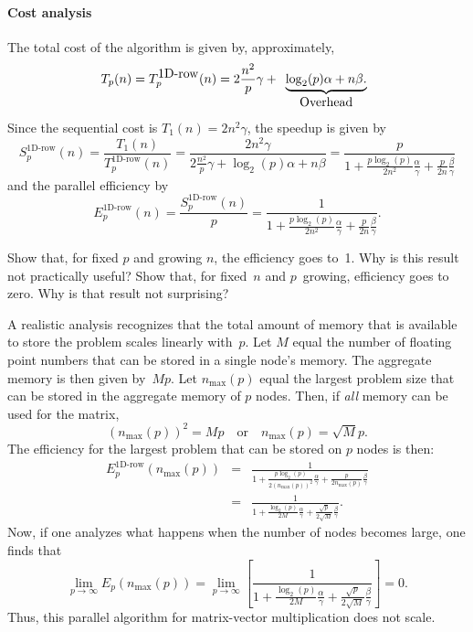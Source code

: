 \paragraph*{Cost analysis}

The total cost of the algorithm is given by, approximately,
\[
T_p(n) = T_p^{\mbox{1D-row}}(n) = 
2 \frac{n^2}{p} \gamma + 
\begin{array}[t]{c}
\underbrace{\log_2(p) \alpha + n \beta.}
\\
\mbox{Overhead}
\end{array}
\]
Since the sequential cost is $ T_1(n) = 2 n^2 \gamma $, the speedup is given by
\[
S_p^{\mbox{1D-row}}(n) = 
\frac{T_1(n)}
{T_p^{\mbox{1D-row}}(n)} = 
\frac{2 n^2 \gamma}
{ 2 \frac{n^2}{p} \gamma + 
\log_2(p) \alpha + n \beta}
= 
\frac{p}
{ 1 + \frac{p \log_2(p)}{2 n^2} \frac{\alpha}{\gamma} 
+ \frac{p}{2 n} \frac{\beta}{\gamma} }
\]
and the parallel efficiency by
\[
E_p^{\mbox{1D-row}}(n) = 
\frac{S_p^{\mbox{1D-row}}(n)}{p}
= 
\frac{1}
{ 1 + \frac{p \log_2(p)}{2 n^2} \frac{\alpha}{\gamma} 
+ \frac{p}{2 n} \frac{\beta}{\gamma} }.
\]

\begin{exercise}
  Show that, for fixed $p$ and growing $n$, the efficiency goes
  to~1. Why is this result not practically useful? Show that, for
  fixed~$n$ and $p$~growing, efficiency goes to zero. Why is that
  result not surprising?
\end{exercise}

A realistic analysis recognizes that the total amount of memory that is
available to store the problem scales linearly with~$ p $.  Let $ M $
equal the number of floating point numbers that can be stored in a
single node's memory.  The aggregate memory is then given by~$ M p $.
Let $ n_{\mbox{max}}(p) $ equal the largest problem size that can be
stored in the aggregate memory of $ p $ nodes.  Then, if {\em all}
memory can be used for the matrix,
\[
(n_{\mbox{max}}(p))^2 = M p
\quad
\mbox{or}
\quad
n_{\mbox{max}}(p) = \sqrt{M} {p}.
\]
The efficiency for the largest problem that can be stored on $ p $
nodes is then:
\begin{eqnarray*}
E_p^{\mbox{1D-row}}(n_{\mbox{max}}(p)) &=& 
\frac{1}
{1 + \frac{p \log_2(p)}{2 (n_{\mbox{max}}(p))^2} \frac{\alpha}{\gamma} 
+ \frac{p}{2 n_{\mbox{max}}(p)} \frac{\beta}{\gamma} }
\\
&=&
\frac{1}
{ 1 + \frac{\log_2(p)}{2 M} \frac{\alpha}{\gamma} 
+ \frac{\sqrt{p}}{2 \sqrt{M}} \frac{\beta}{\gamma} }.
\end{eqnarray*}
Now, if one analyzes what happens when the number of nodes
becomes large, one finds that
\[
\lim_{p \rightarrow \infty} E_p( n_{\mbox{max}}(p) ) 
=
\lim_{p \rightarrow \infty}
\left[
\frac{1}
{1 + \frac{\log_2(p)}{2 M} \frac{\alpha}{\gamma} 
+ \frac{\sqrt{p}}{2 \sqrt{M}} \frac{\beta}{\gamma} }
\right]
=
0.
\]
Thus, this parallel algorithm for matrix-vector multiplication
does not scale.

